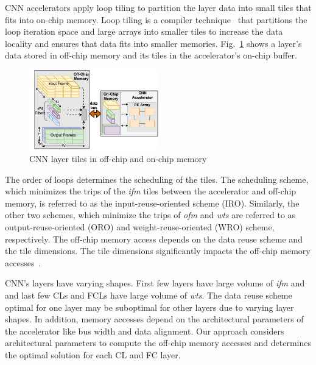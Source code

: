 \documentclass[a4paper,10pt]{article}
\begin{document}
CNN accelerators apply loop tiling to partition the layer data into small tiles that fits into on-chip memory. Loop tiling is a compiler  technique~\cite{aho2006compilers} that partitions the loop iteration space and large arrays into smaller tiles to increase the data locality and ensures that data fits into smaller memories. 
Fig.~\ref{fig:partitioningDataUsingTiling} shows a layer's data stored in off-chip memory and its tiles in the accelerator's on-chip buffer.
\begin{figure}[!htb]
	\centering
	\includegraphics[width=0.5\textwidth]{images/AboutTheCNNTiles.pdf}
	\caption{CNN layer tiles in off-chip and on-chip memory}
	\label{fig:partitioningDataUsingTiling}
	\vspace{-1.0em}
\end{figure}
 The order of loops determines the scheduling of the tiles. The scheduling scheme, which minimizes the trips of the \textit{ifm} tiles between the accelerator and off-chip memory, is referred to as the input-reuse-oriented scheme (IRO). Similarly, the other two schemes, which minimize the trips of \textit{ofm} and \textit{wts} are referred to as output-reuse-oriented (ORO) and weight-reuse-oriented (WRO) scheme, respectively. The off-chip memory access depends on the data reuse scheme and the tile dimensions.  The tile dimensions significantly impacts the off-chip memory accesses~\cite{zhang2015optimizing, Li2018SmartShuttleOO}. 
   
CNN's layers have varying shapes. First few layers have large volume of \textit{ifm} and  and last few CLs and FCLs have large volume of \textit{wts}. The data reuse scheme optimal for one layer may be suboptimal for other layers due to varying layer shapes. In addition, memory accesses depend on the architectural parameters of the accelerator like bus width and data alignment. Our approach considers architectural parameters to compute the off-chip memory accesses and determines the optimal solution for each CL and FC layer.
\end{document}
